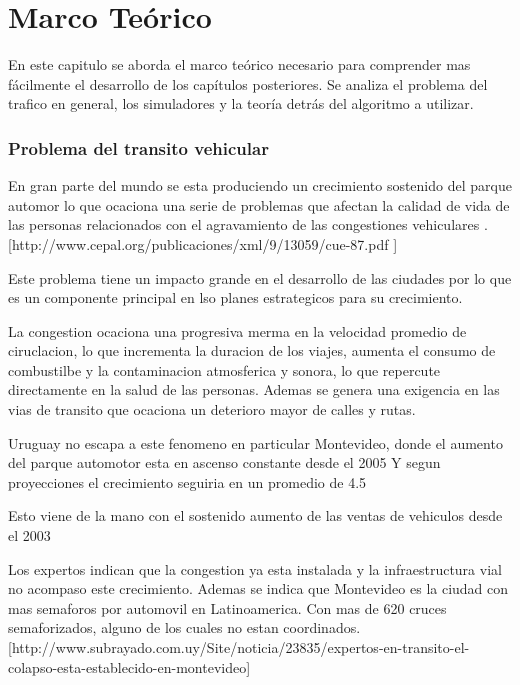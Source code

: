 \chapter{Marco Teórico}

 En este capitulo se aborda el marco teórico necesario para comprender mas fácilmente el desarrollo de los capítulos posteriores. Se analiza el problema del trafico en general, los simuladores y la teoría detrás del algoritmo a utilizar.

\subsection{Problema del transito vehicular}

En gran parte del mundo se esta produciendo un crecimiento sostenido del parque automor lo que ocaciona una serie de problemas que afectan la calidad de vida de las personas relacionados con el agravamiento de las congestiones vehiculares .[http://www.cepal.org/publicaciones/xml/9/13059/cue-87.pdf ]

Este problema tiene un impacto grande en el desarrollo de las ciudades por lo que es un componente principal en lso planes estrategicos para su crecimiento.

La congestion ocaciona una progresiva merma en la velocidad promedio de ciruclacion, lo que incrementa la duracion de los viajes, aumenta el consumo de combustilbe y la contaminacion atmosferica y sonora, lo que repercute directamente en la salud de las personas. 
Ademas se genera una exigencia en las vias de transito que ocaciona un deterioro mayor de calles y rutas.

Uruguay no escapa a este fenomeno en particular Montevideo, donde el aumento del parque automotor esta en ascenso constante desde el 2005 %
Y segun proyecciones el crecimiento seguiria en un promedio de 4.5%

Esto viene de la mano con el sostenido aumento de las ventas de vehiculos  desde el 2003 %

Los expertos indican que la congestion ya esta instalada y la infraestructura vial no acompaso este crecimiento. Ademas se indica que Montevideo es la ciudad con mas semaforos por automovil en Latinoamerica. Con mas de 620 cruces semaforizados, alguno de los cuales no estan coordinados.[http://www.subrayado.com.uy/Site/noticia/23835/expertos-en-transito-el-colapso-esta-establecido-en-montevideo]

